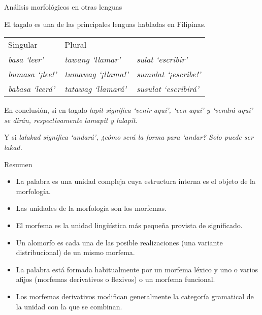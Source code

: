 \documentclass{beamer}
\begin{document}
\begin{frame}{Análisis morfológicos en otras lenguas}

El tagalo es una de las principales lenguas habladas en Filipinas.

\begin{center}
\begin{tabular}{l l l}
Singular & Plural \\
\it{basa} `leer' & \it{tawang} `llamar' & \it{sulat} `escribir' \\
\it{bumasa} `¡lee!' & \it{tumawag} `¡llama!' & \it{sumulat} `¡escribe!' \\
\it{babasa} `leerá' & \it{tatawag} `llamará' & \it{susulat} `escribirá' \\
\end{tabular}
\end{center}	

En conclusión, si en tagalo \it{lapit} significa `venir aquí', `ven aquí' y `vendrá aquí' se dirán, respectivamente \pause \it{lumapit} y \it{lalapit}. 

Y si \it{lalakad} significa `andará', ¿cómo será la forma para `andar? \pause Solo puede ser \it{lakad}.

\end{frame}

\begin{frame}{Resumen}

\begin{itemize}
	\item La palabra es una unidad compleja cuya estructura interna es el objeto de la morfología.
	\item Las unidades de la morfología son los morfemas.
	\item El morfema es la unidad lingüística más pequeña provista de significado.
	\item Un alomorfo es cada una de las posible realizaciones (una variante distribucional) de un mismo morfema.
	\item La palabra está formada habitualmente por un morfema léxico y uno o varios afijos (morfemas derivativos o flexivos) o un morfema funcional.
	\item Los morfemas derivativos modifican generalmente la categoría gramatical de la unidad con la que se combinan. 
\end{itemize}
	
\end{frame}
\end{document}
